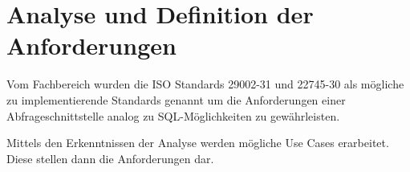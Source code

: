 \chapter{Analyse und Definition der Anforderungen } \label{kap:analyse_und_definition}

Vom Fachbereich wurden die ISO Standards 29002-31 und 22745-30 als mögliche zu implementierende Standards genannt um die Anforderungen einer Abfrageschnittstelle analog zu SQL-Möglichkeiten zu gewährleisten.   

Mittels den Erkenntnissen der Analyse werden mögliche Use Cases erarbeitet. Diese stellen dann die Anforderungen dar.



